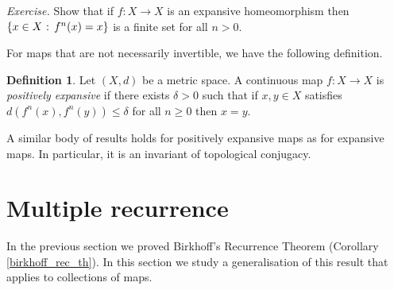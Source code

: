 \documentclass[12pt]{article}
\theoremstyle{definition}
\newtheorem{definition}[theorem]{Definition}
\theoremstyle{remark}
\begin{document}
\medskip
\noindent
{\it Exercise.} Show that if $f : X \to X$ is an expansive homeomorphism then 
$\{x \in X \hbox{ : } f^n(x)=x\}$ is a finite set for all $n >0$.




\medskip
For maps that are not necessarily invertible, we have the following definition.



\begin{definition}
Let $(X,d)$ be a metric space.
A continuous map $f : X \to X$  is {\it positively expansive} if 
there exists $\delta>0$ such that if $x,y \in X$
satisfies
$d(f^n(x),f^n(y)) \le \delta$ for all $n \ge 0$ then $x=y$.
\end{definition}

%



A similar body of results holds for positively expansive maps as for expansive maps. In particular, it is an invariant of topological conjugacy.

\section{Multiple recurrence}

In the previous section we proved Birkhoff's Recurrence Theorem (Corollary \ref{birkhoff_rec_th}). In this section we study a generalisation of this result that applies to collections of maps. 
\end{document}
